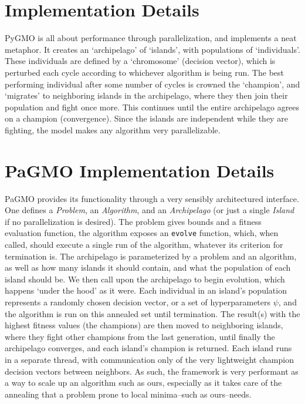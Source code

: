\section{Implementation Details} 

PyGMO is all about performance through parallelization, and implements a neat metaphor. It creates an `archipelago' of `islands', with populations of `individuals'. These individuals are defined by a `chromosome' (decision vector), which is perturbed each cycle according to whichever algorithm is being run. The best performing individual after some number of cycles is crowned the `champion', and `migrates' to neighboring islands in the archipelago, where they then join their population and fight once more. This continues until the entire archipelago agrees on a champion (convergence). Since the islands are independent while they are fighting, the model makes any algorithm very parallelizable.

\section{PaGMO Implementation Details}
PaGMO provides its functionality through a very sensibly architectured interface. One defines a \emph{Problem}, an \emph{Algorithm}, and an \emph{Archipelago} (or just a single \emph{Island} if no parallelization is desired). The problem gives bounds and a fitness evaluation function, the algorithm exposes an \texttt{evolve} function, which, when called, should execute a single run of the algorithm, whatever its criterion for termination is. The archipelago is parameterized by a problem and an algorithm, as well as how many islands it should contain, and what the population of each island should be. We then call upon the archipelago to begin evolution, which happens `under the hood' as it were. Each individual in an island's population represents a randomly chosen decision vector, or a set of hyperparameters \(\psi\), and the algorithm is run on this annealed set until termination. The result(s) with the highest fitness values (the champions) are then moved to neighboring islands, where they fight other champions from the last generation, until finally the archipelago converges, and each island's champion is returned. Each island runs in a separate thread, with communication only of the very lightweight champion decision vectors between neighbors. As such, the framework is very performant as a way to scale up an algorithm such as ours, especially as it takes care of the annealing that a problem prone to local minima--such as ours--needs.